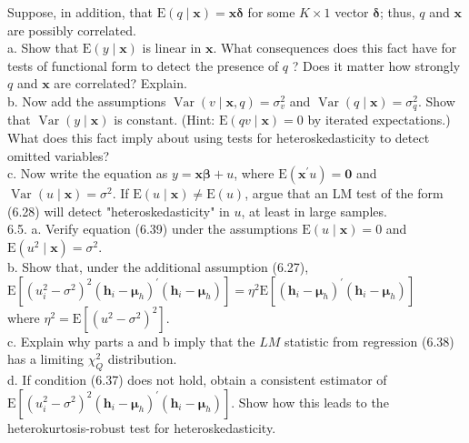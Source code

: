 \documentclass[10pt]{article}
\begin{document}
Suppose, in addition, that $\mathrm{E}(q \mid \mathbf{x})=\mathbf{x} \boldsymbol{\delta}$ for some $K \times 1$ vector $\boldsymbol{\delta}$; thus, $q$ and $\mathbf{x}$ are possibly correlated.\\
a. Show that $\mathrm{E}(y \mid \mathbf{x})$ is linear in $\mathbf{x}$. What consequences does this fact have for tests of functional form to detect the presence of $q$ ? Does it matter how strongly $q$ and $\mathbf{x}$ are correlated? Explain.\\
b. Now add the assumptions $\operatorname{Var}(v \mid \mathbf{x}, q)=\sigma_{v}^{2}$ and $\operatorname{Var}(q \mid \mathbf{x})=\sigma_{q}^{2}$. Show that $\operatorname{Var}(y \mid \mathbf{x})$ is constant. (Hint: $\mathrm{E}(q v \mid \mathbf{x})=0$ by iterated expectations.) What does this fact imply about using tests for heteroskedasticity to detect omitted variables?\\
c. Now write the equation as $y=\mathbf{x} \boldsymbol{\beta}+u$, where $\mathrm{E}\left(\mathbf{x}^{\prime} u\right)=\mathbf{0}$ and $\operatorname{Var}(u \mid \mathbf{x})=\sigma^{2}$. If $\mathrm{E}(u \mid \mathbf{x}) \neq \mathrm{E}(u)$, argue that an LM test of the form (6.28) will detect "heteroskedasticity" in $u$, at least in large samples.\\
6.5. a. Verify equation (6.39) under the assumptions $\mathrm{E}(u \mid \mathbf{x})=0$ and $\mathrm{E}\left(u^{2} \mid \mathbf{x}\right)=\sigma^{2}$.\\
b. Show that, under the additional assumption (6.27),\\
$\mathrm{E}\left[\left(u_{i}^{2}-\sigma^{2}\right)^{2}\left(\mathbf{h}_{i}-\boldsymbol{\mu}_{h}\right)^{\prime}\left(\mathbf{h}_{i}-\boldsymbol{\mu}_{h}\right)\right]=\eta^{2} \mathrm{E}\left[\left(\mathbf{h}_{i}-\boldsymbol{\mu}_{h}\right)^{\prime}\left(\mathbf{h}_{i}-\boldsymbol{\mu}_{h}\right)\right]$\\
where $\eta^{2}=\mathrm{E}\left[\left(u^{2}-\sigma^{2}\right)^{2}\right]$.\\
c. Explain why parts a and b imply that the $L M$ statistic from regression (6.38) has a limiting $\chi_{Q}^{2}$ distribution.\\
d. If condition (6.37) does not hold, obtain a consistent estimator of $\mathrm{E}\left[\left(u_{i}^{2}-\sigma^{2}\right)^{2}\left(\mathbf{h}_{i}-\boldsymbol{\mu}_{h}\right)^{\prime}\left(\mathbf{h}_{i}-\boldsymbol{\mu}_{h}\right)\right]$. Show how this leads to the heterokurtosis-robust test for heteroskedasticity.\\
\end{document}
